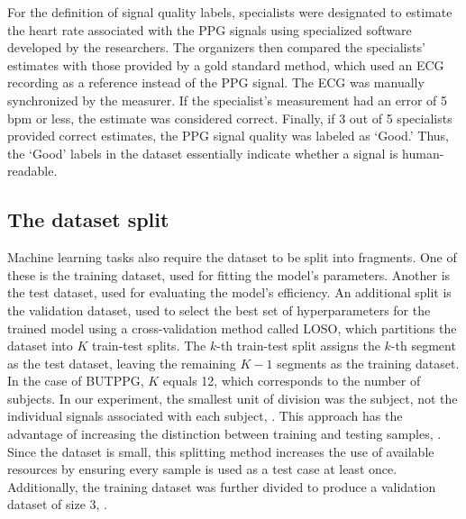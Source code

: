 For the definition of signal quality labels, specialists were designated to estimate the heart rate associated with the \gls{PPG} signals using specialized software developed by the researchers. The organizers then compared the specialists' estimates with those provided by a gold standard method, which used an ECG recording as a reference instead of the \gls{PPG} signal. The ECG was manually synchronized by the measurer. If the specialist's measurement had an error of 5 \gls{bpm} or less, the estimate was considered correct. Finally, if 3 out of 5 specialists provided correct estimates, the \gls{PPG} signal quality was labeled as `Good.' Thus, the `Good' labels in the dataset essentially indicate whether a signal is human-readable.

\subsection{The dataset split}

Machine learning tasks also require the dataset to be split into fragments. One of these is the training dataset, used for fitting the model's parameters. Another is the test dataset, used for evaluating the model's efficiency. An additional split is the validation dataset, used to select the best set of hyperparameters for the trained model  using a cross-validation method called \gls{LOSO}, which partitions the dataset into $K$ train-test splits. The $k$-th train-test split assigns the $k$-th segment as the test dataset, leaving the remaining $K-1$ segments as the training dataset. In the case of \gls{BUTPPG}, $K$ equals 12, which corresponds to the number of subjects. In our experiment, the smallest unit of division was the subject, not the individual signals associated with each subject, . This approach has the advantage of increasing the distinction between training and testing samples, . Since the dataset is small, this splitting method increases the use of available resources by ensuring every sample is used as a test case at least once. Additionally, the training dataset was further divided  to produce a validation dataset of size 3, .

